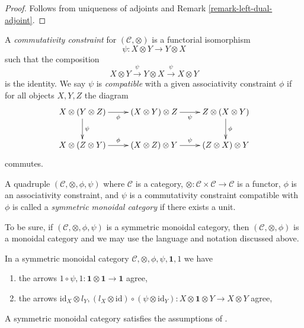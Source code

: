 \begin{proof}
Follows from uniqueness of adjoints and Remark \ref{remark-left-dual-adjoint}.
\end{proof}

\noindent
A {\it commutativity constraint} for $(\mathcal{C}, \otimes)$ is a
functorial isomorphism
$$
\psi : X \otimes Y \longrightarrow Y \otimes X
$$
such that the composition
$$
X \otimes Y \xrightarrow{\psi} Y \otimes X \xrightarrow{\psi} X \otimes Y
$$
is the identity. We say $\psi$ is {\it compatible} with a given associativity
constraint $\phi$ if for all objects $X, Y, Z$ the diagram
\begin{equation}
\label{equation-hexagon}
\vcenter{
\xymatrix{
X \otimes (Y \otimes Z) \ar[r]_\phi \ar[d]^\psi &
(X \otimes Y) \otimes Z \ar[r]_\psi &
Z \otimes (X \otimes Y) \ar[d]^\phi \\
X \otimes (Z \otimes Y) \ar[r]^\phi &
(X \otimes Z) \otimes Y \ar[r]^\psi &
(Z \otimes X) \otimes Y
}
}
\end{equation}
commutes.

\begin{definition}
\label{definition-symmetric-monoidal-category}
A quadruple $(\mathcal{C}, \otimes, \phi, \psi)$ where
$\mathcal{C}$ is a category,
$\otimes : \mathcal{C} \times \mathcal{C} \to \mathcal{C}$ is a functor,
$\phi$ is an associativity constraint, and
$\psi$ is a commutativity constraint compatible with $\phi$
is called a {\it symmetric monoidal category} if there exists
a unit.
\end{definition}

\noindent
To be sure, if $(\mathcal{C}, \otimes, \phi, \psi)$ is a
symmetric monoidal category, then $(\mathcal{C}, \otimes, \phi)$
is a monoidal category and we may use the language and notation
discussed above.

\begin{lemma}
\label{lemma-symmetric-monoidal-coherence}
In a symmetric monoidal category
$\mathcal{C}, \otimes, \phi, \psi, \mathbf{1}, 1$
we have
\begin{enumerate}
\item the arrows $1 \circ \psi, 1 :
\mathbf{1} \otimes \mathbf{1} \to \mathbf{1}$ agree,
\item the arrows $\text{id}_X \otimes l_Y,
(l_X \otimes \text{id}) \circ (\psi \otimes \text{id}_Y):
X \otimes \mathbf{1} \otimes Y \to X \otimes Y$ agree,
\end{enumerate}
A symmetric monoidal category satisfies the assumptions of
\cite[Theorem 5.1]{associativity}.
\end{lemma}


